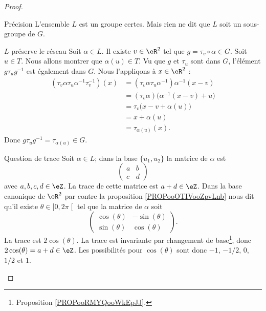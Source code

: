 \begin{proof}
\begin{subproof}
        \item[Précision]
            L'ensemble \( L\) est un groupe certes. Mais rien ne dit que \( L\) soit un sous-groupe de \( G\).
        \item[\( L\) préserve le réseau]
            Soit \( \alpha\in L\). Il existe \( v\in \eR^2\) tel que \( g=\tau_v\circ \alpha\in G\). Soit \( u\in T\). Nous allons montrer que \( \alpha(u)\in T\). Vu que \( g\) et \( \tau_u\) sont dans \( G\), l'élément \( g\tau_ug^{-1}\) est également dans \( G\). Nous l'appliqons à \( x\in \eR^2\) :
            \begin{subequations}
                \begin{align}
                    (\tau_v\alpha\tau_u\alpha^{-1}\tau_v^{-1})(x)&=(\tau_v\alpha\tau_u\alpha^{-1})\alpha^{-1}(x-v)\\
                    &=(\tau_v\alpha)\big( \alpha^{-1}(x-v)+u \big)\\
                    &=\tau_v\big( x-v+\alpha(u) \big)\\
                    &=x+\alpha(u)\\
                    &=\tau_{\alpha(u)}(x).
                \end{align}
            \end{subequations}
            Donc \( g\tau_ug^{-1}=\tau_{\alpha(u)}\in G\).
        \item[Question de trace]
            Soit \( \alpha\in L\); dans la base \( \{ u_1,u_2 \}\) la matrice de \( \alpha\) est
            \begin{equation}
                \begin{pmatrix}
                    a&b\\
                    c&d
                \end{pmatrix}
            \end{equation}
            avec \( a,b,c,d\in \eZ\). La trace de cette matrice est \( a+d\in \eZ\). Dans la base canonique de \( \eR^2\) par contre la proposition \ref{PROPooOTIVooZpvLnb} nous dit qu'il existe \( \theta\in \mathopen[ 0 , 2\pi \mathclose[\) tel que la matrice de \( \alpha\) soit
                \begin{equation}
                    \begin{pmatrix}
                        \cos(\theta)    &   -\sin(\theta)    \\ 
                        \sin(\theta)    &   \cos(\theta)    
                    \end{pmatrix}.
                \end{equation}
                La trace est \( 2\cos(\theta)\). La trace est invariante par changement de base\footnote{Proposition \ref{PROPooRMYQooWkEpJJ}.}, donc \( 2\cos(\theta)=a+d\in \eZ\). Les possibilités pour \( \cos(\theta)\) sont donc \( -1\), \( -1/2\), \( 0\), \( 1/2\) et \( 1\).


\end{subproof}
\end{proof}
